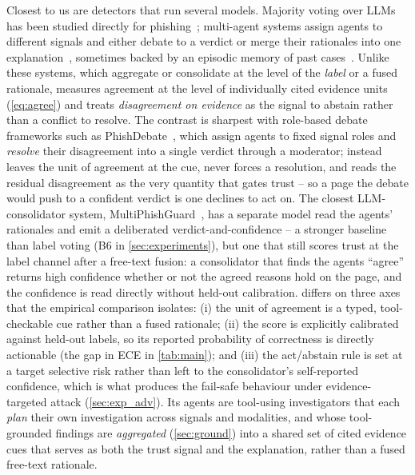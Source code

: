 Closest to us are detectors that run several models. Majority voting over LLMs has
been studied directly for phishing~\cite{ensembleornot2024}; multi-agent systems
assign agents to different signals and either debate to a verdict or merge their
rationales into one explanation~\cite{phishdebate2025,multiphishguard2025},
sometimes backed by an episodic memory of past cases~\cite{memophish2026}.
Unlike these systems, which aggregate or consolidate at the level of the
\emph{label} or a fused rationale, \toolname{} measures agreement at the level of
individually cited evidence units (\eqref{eq:agree}) and treats \emph{disagreement
on evidence} as the signal to abstain rather than a conflict to resolve. The contrast is
sharpest with role-based debate frameworks such as PhishDebate~\cite{phishdebate2025},
which assign agents to fixed signal roles and \emph{resolve} their disagreement into a
single verdict through a moderator; \toolname{} instead leaves the unit of agreement at
the cue, never forces a resolution, and reads the residual disagreement as the very
quantity that gates trust -- so a page the debate would push to a confident verdict is one
\toolname{} declines to act on. The closest LLM-consolidator system,
MultiPhishGuard~\cite{multiphishguard2025}, has a separate model read the agents'
rationales and emit a deliberated verdict-and-confidence -- a stronger baseline than
label voting (B6 in \autoref{sec:experiments}), but one that still scores trust at the
label channel after a free-text fusion: a consolidator that finds the agents
``agree'' returns high confidence whether or not the agreed reasons hold on the page,
and the confidence is read directly without held-out calibration. \toolname{} differs
on three axes that the empirical comparison isolates: (i) the unit of agreement is a
typed, tool-checkable cue rather than a fused rationale; (ii) the score is
explicitly calibrated against held-out labels, so its reported probability of
correctness is directly actionable (the gap in ECE in \autoref{tab:main}); and (iii)
the act/abstain rule is set at a target selective risk rather than left to the
consolidator's self-reported confidence, which is what produces the fail-safe
behaviour under evidence-targeted attack (\autoref{sec:exp_adv}). Its agents
are tool-using investigators that each \emph{plan} their own investigation across
signals and modalities, and whose tool-grounded findings are \emph{aggregated}
(\autoref{sec:ground}) into a shared set of cited evidence cues that serves as both the
trust signal and the explanation, rather than a fused free-text rationale.

